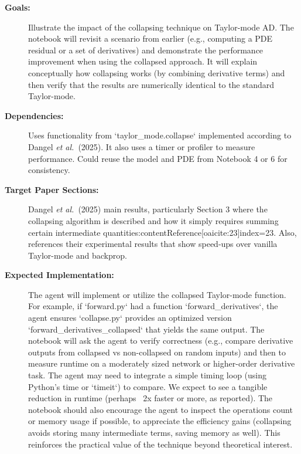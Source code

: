 \documentclass[11pt]{article}
\begin{document}
\begin{description}
  \item[\textbf{Goals:}] Illustrate the impact of the collapsing technique on Taylor-mode AD. The notebook will revisit a scenario from earlier (e.g., computing a PDE residual or a set of derivatives) and demonstrate the performance improvement when using the collapsed approach. It will explain conceptually how collapsing works (by combining derivative terms) and then verify that the results are numerically identical to the standard Taylor-mode.
  \item[\textbf{Dependencies:}] Uses functionality from `taylor_mode.collapse` implemented according to Dangel \textit{et al.}\ (2025). It also uses a timer or profiler to measure performance. Could reuse the model and PDE from Notebook 4 or 6 for consistency.
  \item[\textbf{Target Paper Sections:}] Dangel \textit{et al.}\ (2025) main results, particularly Section 3 where the collapsing algorithm is described and how it simply requires summing certain intermediate quantities:contentReference[oaicite:23]{index=23}. Also, references their experimental results that show speed-ups over vanilla Taylor-mode and backprop.
  \item[\textbf{Expected Implementation:}] The agent will implement or utilize the collapsed Taylor-mode function. For example, if `forward.py` had a function `forward_derivatives`, the agent ensures `collapse.py` provides an optimized version `forward_derivatives_collapsed` that yields the same output. The notebook will ask the agent to verify correctness (e.g., compare derivative outputs from collapsed vs non-collapsed on random inputs) and then to measure runtime on a moderately sized network or higher-order derivative task. The agent may need to integrate a simple timing loop (using Python's time or `timeit`) to compare. We expect to see a tangible reduction in runtime (perhaps ~2x faster or more, as reported). The notebook should also encourage the agent to inspect the operations count or memory usage if possible, to appreciate the efficiency gains (collapsing avoids storing many intermediate terms, saving memory as well). This reinforces the practical value of the technique beyond theoretical interest.
\end{description}
\end{document}
